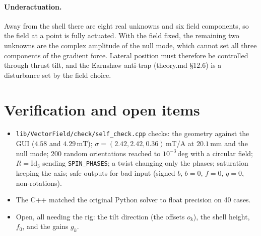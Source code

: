 \documentclass[11pt]{article}
\newcommand{\Id}{\mathrm{Id}}
\begin{document}
\paragraph{Underactuation.} Away from the shell there are eight real unknowns and six field
components, so the field at a point is fully actuated. With the field fixed, the remaining two
unknowns are the complex amplitude of the null mode, which cannot set all three components of the
gradient force. Lateral position must therefore be controlled through thrust tilt, and the
Earnshaw anti-trap (theory.md \S12.6) is a disturbance set by the field choice.

\section{Verification and open items}
\begin{itemize}[nosep]
  \item \texttt{lib/VectorField/check/self\_check.cpp} checks:
        the geometry against the GUI ($4.58$ and $4.29$\,mT);
        $\sigma=(2.42,2.42,0.36)$\,mT/A at $20.1$\,mm and the null mode;
        200 random orientations reached to $10^{-3}$\,deg with a circular field;
        $R=\Id_3$ sending \texttt{SPIN\_PHASES};
        a twist changing only the phases;
        saturation keeping the axis;
        safe outputs for bad input (signed $b$, $b=0$, $f=0$, $q=0$, non-rotations).
  \item The C++ matched the original Python solver to float precision on 40 cases.
  \item Open, all needing the rig: the tilt direction (the offsets $o_k$), the shell height, $f_0$,
        and the gains $g_k$.
\end{itemize}
\end{document}
